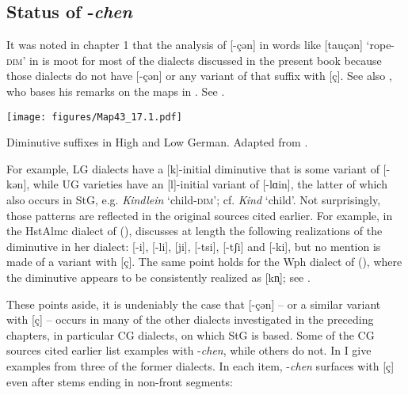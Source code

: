 \subsection{Status of -\textit{chen}}\label{sec:17.3.2}

It was noted in chapter 1 that the analysis of [-çən] in words like [tauçən] ‘rope-\textsc{dim}’ in  is moot for most of the dialects discussed in the present book because those dialects do not have [-çən] or any variant of that suffix with [ç]. See also \citet[64--70]{Robinson2001}, who bases his remarks on the maps in \citet{Tiefenbach1987}. See .

\begin{map}
\texttt{[image: figures/Map43\_17.1.pdf]}
\caption[Diminutive suffixes in High and Low German]{Diminutive suffixes in High and Low German. Adapted from \citet{Tiefenbach1987}.}\label{map:43}
\end{map}

For example, LG dialects have a [k]-initial diminutive that is some variant of [\mbox{-kən}], while UG varieties have an [l]-initial variant of [-lɑin], the latter of which also occurs in StG, e.g. \textit{Kindlein} ‘child-\textsc{dim}’; cf. \textit{Kind} ‘child’. Not surprisingly, those patterns are reflected in the original sources cited earlier. For example, in the HstAlmc dialect of  (), \citet[168--172]{Wipf1910} discusses at length the following realizations of the diminutive in her dialect: [-i], [-li], [ji], [-tsi], [-tʃi] and [-ki], but no mention is made of a variant with [ç]. The same point holds for the Wph dialect of  (), where the diminutive appears to be consistently realized as [kn̩]; see \citet{Holthausen1886}.

These points aside, it is undeniably the case that [-çən] -- or a similar variant with [ç] --  occurs in many of the other dialects investigated in the preceding chapters, in particular CG dialects, on which StG is based. Some of the CG sources cited earlier list examples with -\textit{chen}, while others do not. In  I give examples from three of the former dialects. In each item, -\textit{chen} surfaces with [ç] even after stems ending in non-front segments:



